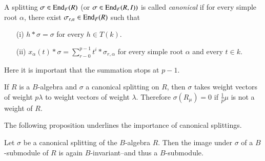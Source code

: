 \begin{definition}\label{chap4-defi4.3.5}
A splitting $\sigma\in \operatorname{End}_{F}(R)$ (or $\sigma\in \operatorname{End}_{F}(R,I))$ is
called {\em canonical} if for every simple root $\alpha$, there exist
$\sigma_{r,\alpha}\in \operatorname{End}_{F}(R)$ such that
\begin{itemize}
\item[(i)] $h\ast\sigma=\sigma$ for every $h\in T(k)$.

\item[(ii)] $x_{\alpha}(t)\ast
  \sigma=\sum\limits^{p-1}_{r-0}t^{i}\ast\sigma_{r,\alpha}$ for every
  simple root $\alpha$ and every $t\in k$.
\end{itemize}

Here it is important that the summation stops at $p-1$.
\end{definition}

\begin{remark}\label{chap4-rem4.3.6}
If $R$ is a $B$-algebra and $\sigma$ a canonical
splitting on $R$, 
then $\sigma$ takes weight vectors of weight $p\lambda$ to weight
vectors of weight $\lambda$. Therefore $\sigma(R_{\mu})=0$ if
$\frac{1}{p}\mu$ is not a weight of $R$.
\end{remark}

The following proposition underlines the importance of canonical
splittings. 

\begin{proposition}\label{chap4-prop4.3.7}
Let $\sigma$ be a canonical splitting of the $B$-algebra $R$. Then the
image under $\sigma$ of a $B$-submodule of $R$ is again
$B$-invariant--and thus a $B$-submodule.
\end{proposition}

